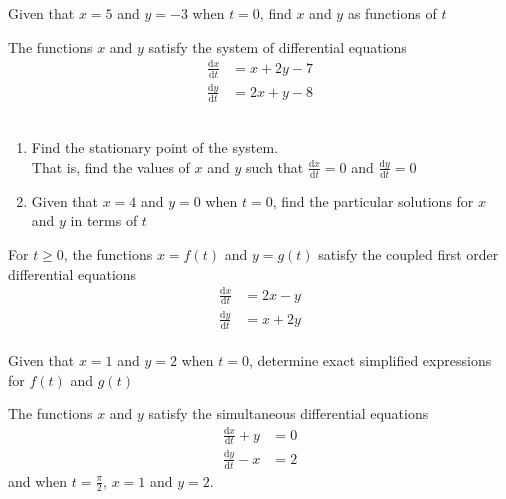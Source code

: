 \documentclass[leqno]{article}
\begin{document}
\begin{enumerate}[
  label=\textbf{\arabic*.},
  leftmargin=*,
  topsep=0pt,
  partopsep=0pt,
  parsep=0pt
]
Given that $x=5$ and $y=-3$ when $t=0$, find $x$ and $y$ as functions of $t$  \\

\newpage

\questionitem

The functions $x$ and $y$ satisfy the system of differential equations
\begin{align*}
\frac{\mathrm{d}x}{\mathrm{d}t}&=x+2y-7 \\[5pt]
\frac{\mathrm{d}y}{\mathrm{d}t}&=2x+y-8
\end{align*}\\
\begin{enumerate}[label=\textbf{(\alph*)}]
  \item Find the stationary point of the system.\\ That is, find the values of $x$ and $y$ such that $\frac{\mathrm{d}x}{\mathrm{d}t}=0$ and $\frac{\mathrm{d}y}{\mathrm{d}t}=0$  \\
  \item Given that $x=4$ and $y=0$ when $t=0$, find the particular solutions for $x$ and $y$ in terms of $t$  \\
\end{enumerate}

\newpage

\questionitem

For $t\ge 0$, the functions $x=f(t)$ and $y=g(t)$ satisfy the coupled first order differential equations \\
\begin{align*}
\frac{\mathrm{d}x}{\mathrm{d}t}&=2x-y \\[5pt]
\frac{\mathrm{d}y}{\mathrm{d}t}&=x+2y
\end{align*} \\
Given that $x=1$ and $y=2$ when $t=0$, determine exact simplified expressions for $f(t)$ and $g(t)$  \\

\newpage

\questionitem

The functions $x$ and $y$ satisfy the simultaneous differential equations \\
\begin{align*}
\frac{\mathrm{d}x}{\mathrm{d}t}+y&=0\\[5pt]
\frac{\mathrm{d}y}{\mathrm{d}t}-x&=2
\end{align*}
and when $t=\frac{\pi}{2}$, $x=1$ and $y=2$. \\


\end{enumerate}
\end{document}
